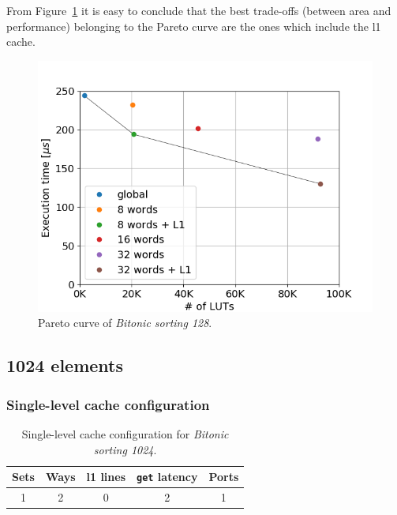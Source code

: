 \documentclass[11pt,a4paper,oneside]{memoir}
\begin{document}
From Figure~\ref{fig:bitonic_128_design_space} it is easy to conclude that the
best trade-offs (between area and performance) belonging to the Pareto curve
are the ones which include the \ac{l1} cache.

\begin{figure}[H]
	\centering
	\includegraphics[width=.8\textwidth]{bitonic_design_space}
	\caption{Pareto curve of \emph{Bitonic sorting 128}.}
	\label{fig:bitonic_128_design_space}
\end{figure}

\iffalse
\subsection{1024 elements}
\subsubsection{Single-level cache configuration}
\begin{table}[H]
	\begin{center}
		\begin{tabular}{ccccc}
			\hline
			\rowcolor{gray!50}
			\textbf{Sets} & \textbf{Ways} & \textbf{\ac{l1} lines} &
			\textbf{\texttt{get} latency} & \textbf{Ports} \\
			\hline
			1 & 2 & 0 & 2 & 1 \\
			\hline
		\end{tabular}
	\end{center}
	\caption{Single-level cache configuration for \emph{Bitonic sorting 1024}.}
	\label{tab:bitonic_1024_no_l1_config}
\end{table}
\end{document}
